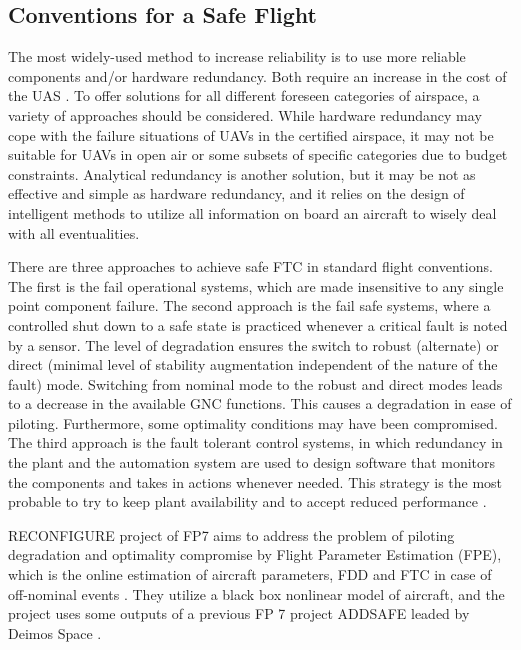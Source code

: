 \subsection{Conventions for a Safe Flight}\label{ch2:conventions}

The most widely-used method to increase reliability is to use more reliable components and/or hardware redundancy. 
Both require an increase in the cost of the UAS \cite{angelov2012sense}. To offer solutions for all different foreseen categories of airspace, a variety of approaches should be considered. 
While hardware redundancy may cope with the failure situations of UAVs in the certified airspace, it may not be suitable for UAVs in open air or some subsets of specific categories due to budget 
constraints. Analytical redundancy is another solution, but it may be not as effective and 
simple as hardware redundancy, and it relies on the design of intelligent methods to 
utilize all information on board an aircraft to wisely deal with all eventualities.  

There are three approaches to achieve safe FTC in standard flight conventions. 
The first is the fail operational systems, which are made insensitive to any single 
point component failure. The second approach is the fail safe systems, where a 
controlled shut down to a safe state is practiced whenever a critical fault is noted by a sensor.
The level of degradation ensures the switch to robust (alternate) or 
direct (minimal level of stability augmentation independent of the nature of the fault) mode. 
Switching from nominal mode to the robust and direct modes leads to a decrease 
in the available GNC functions. This causes a degradation in ease of piloting. Furthermore, some optimality conditions may have been compromised. The third approach 
is the fault tolerant control systems, in which redundancy in the plant and the automation 
system are used to design software that monitors the components and takes in 
actions whenever needed. This strategy is the most probable to try to keep plant availability 
and to accept reduced performance \cite{blanke2000fault}.

RECONFIGURE project of FP7 \cite{goupil2015overview} aims to address the problem of piloting degradation and optimality compromise by Flight Parameter Estimation (FPE), which is the online estimation of aircraft parameters, FDD and FTC in case of off-nominal events \cite{RECONFIGURE}.
They utilize a black box nonlinear model of aircraft, and the project uses some outputs of a previous FP 7 project ADDSAFE leaded by Deimos Space \cite{ADDSAFE}.

